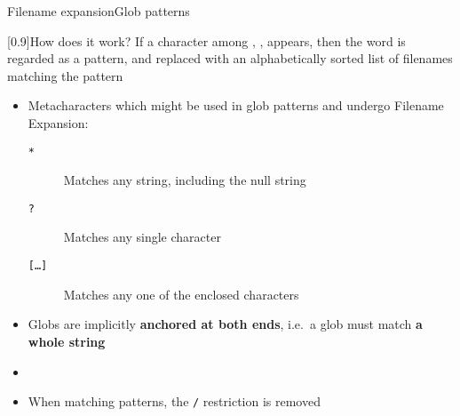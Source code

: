 \begin{frame}{Filename expansion}{Glob patterns}
    \vspace{-3mm}
    \begin{varblock}{}[0.9\textwidth]{How does it work?}
        If a character among \PB{\texttt{*}}, , \PB{\texttt{[}} appears, then the word is regarded as a pattern, and replaced with an alphabetically sorted list of filenames matching the pattern
    \end{varblock}
    \begin{itemize}
        \item Metacharacters which might be used in glob patterns and undergo Filename Expansion:
              \begin{description}
                  \item[\texttt{*}]
                      Matches any string, including the null string
                  \item[\texttt{?}]
                      Matches any single character
                  \item[\texttt{[\ldots]}]
                      Matches any one of the enclosed characters
              \end{description}
        \item Globs are implicitly \textbf{anchored at both ends}, i.e.\ \alert{a glob must match \textbf{a whole string}}
        \item {}
        \item When matching patterns, the \texttt{/} restriction is removed
    \end{itemize}
\end{frame}
